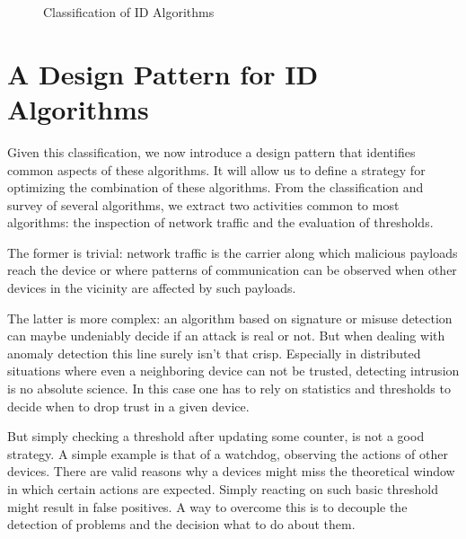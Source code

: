 \documentclass[conference]{IEEEtran}
\begin{document}
\begin{figure}[ht]
  \centering
  \caption{Classification of ID Algorithms}
  \label{fig:classification}
\end{figure}

\section{A Design Pattern for ID Algorithms}
\label{pattern}

Given this classification, we now introduce a design pattern that identifies
common aspects of these algorithms. It will allow us to define a strategy for
optimizing the combination of these algorithms. From the classification and
survey of several algorithms, we extract two activities common to most
algorithms: the inspection of network traffic and the evaluation of thresholds.

The former is trivial: network traffic is the carrier along which malicious
payloads reach the device or where patterns of communication can be observed
when other devices in the vicinity are affected by such payloads.

The latter is more complex: an algorithm based on signature or misuse detection
can maybe undeniably decide if an attack is real or not. But when dealing with
anomaly detection this line surely isn't that crisp. Especially in distributed
situations where even a neighboring device can not be trusted, detecting
intrusion is no absolute science. In this case one has to rely on statistics
and thresholds to decide when to drop trust in a given device.

But simply checking a threshold after updating some counter, is not a good
strategy. A simple example is that of a watchdog\cite{mishra2004intrusion},
observing the actions of other devices. There are valid reasons why a devices
might miss the theoretical window in which certain actions are expected. Simply
reacting on such basic threshold might result in false positives. A way to
overcome this is to decouple the detection of problems and the decision what to
do about them.
\end{document}
